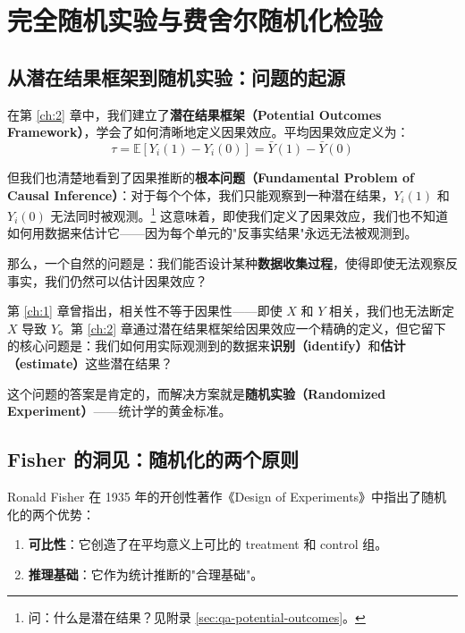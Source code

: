 
\chapter{完全随机实验与费舍尔随机化检验}
\label{ch:3}

\section{从潜在结果框架到随机实验：问题的起源}

在第 \ref{ch:2} 章中，我们建立了\textbf{潜在结果框架（Potential Outcomes Framework）}，学会了如何清晰地定义因果效应。平均因果效应定义为：
\begin{equation}
\tau = \mathbb{E}[Y_i(1) - Y_i(0)] = \bar{Y}(1) - \bar{Y}(0)
\label{eq:average-causal-effect}
\end{equation}

但我们也清楚地看到了因果推断的\textbf{根本问题（Fundamental Problem of Causal Inference）}：对于每个个体，我们只能观察到一种潜在结果，$Y_i(1)$ 和 $Y_i(0)$ 无法同时被观测。\footnote{问：什么是潜在结果？见附录 \cref{sec:qa-potential-outcomes}。} 这意味着，即使我们定义了因果效应，我们也不知道如何用数据来估计它——因为每个单元的"反事实结果"永远无法被观测到。

那么，一个自然的问题是：我们能否设计某种\textbf{数据收集过程}，使得即使无法观察反事实，我们仍然可以估计因果效应？

第 \ref{ch:1} 章曾指出，相关性不等于因果性——即使 $X$ 和 $Y$ 相关，我们也无法断定 $X$ 导致 $Y$。第 \ref{ch:2} 章通过潜在结果框架给因果效应一个精确的定义，但它留下的核心问题是：我们如何用实际观测到的数据来\textbf{识别（identify）}和\textbf{估计（estimate）}这些潜在结果？

这个问题的答案是肯定的，而解决方案就是\textbf{随机实验（Randomized Experiment）}——统计学的黄金标准。

\section{Fisher 的洞见：随机化的两个原则}

Ronald Fisher 在 1935 年的开创性著作《Design of Experiments》中指出了随机化的两个优势：

\begin{enumerate}
  \item \textbf{可比性}：它创造了在平均意义上可比的 treatment 和 control 组。
  \item \textbf{推理基础}：它作为统计推断的"合理基础"。
\end{enumerate}

